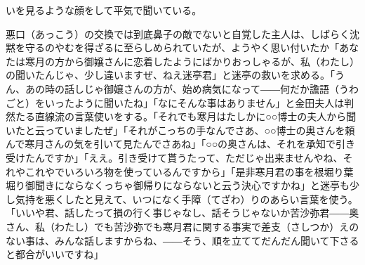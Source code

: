 \documentclass{book}
\begin{document}
いを見るような顔をして平気で聞いている。

悪口（あっこう）の交換では到底鼻子の敵でないと自覚した主人は、しばらく沈黙を守るのやむを得ざるに至らしめられていたが、ようやく思い付いたか「あなたは寒月の方から御嬢さんに恋着したようにばかりおっしゃるが、私（わたし）の聞いたんじゃ、少し違いますぜ、ねえ迷亭君」と迷亭の救いを求める。「うん、あの時の話しじゃ御嬢さんの方が、始め病気になって――何だか譫語（うわごと）をいったように聞いたね」「なにそんな事はありません」と金田夫人は判然たる直線流の言葉使いをする。「それでも寒月はたしかに○○博士の夫人から聞いたと云っていましたぜ」「それがこっちの手なんでさあ、○○博士の奥さんを頼んで寒月さんの気を引いて見たんでさあね」「○○の奥さんは、それを承知で引き受けたんですか」「ええ。引き受けて貰うたって、ただじゃ出来ませんやね、それやこれやでいろいろ物を使っているんですから」「是非寒月君の事を根堀り葉堀り御聞きにならなくっちゃ御帰りにならないと云う決心ですかね」と迷亭も少し気持を悪くしたと見えて、いつになく手障（てざわ）りのあらい言葉を使う。「いいや君、話したって損の行く事じゃなし、話そうじゃないか苦沙弥君――奥さん、私（わたし）でも苦沙弥でも寒月君に関する事実で差支（さしつか）えのない事は、みんな話しますからね、――そう、順を立ててだんだん聞いて下さると都合がいいですね」
\end{document}
